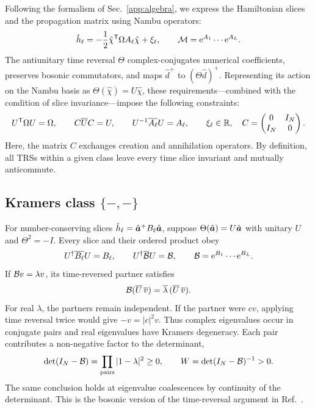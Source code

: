 Following the formalism of Sec.~\ref{app:algebra}, we express the Hamiltonian slices and the propagation matrix using Nambu operators:
\begin{equation}
    \hat h_\ell=-\frac12\hat\chi^{\mathsf{T}}\Omega A_\ell\hat\chi+\xi_\ell,
    \qquad \mathcal{M}=\mathrm{e}^{A_1}\cdots\mathrm{e}^{A_L}.
    \label{eq:trs_configuration_weight}
\end{equation}
The antiunitary time reversal $\Theta$ complex-conjugates numerical coefficients, preserves bosonic commutators, and maps $\hat d^+$ to $(\Theta\hat d)^+$. Representing its action on the Nambu basis as $\Theta(\hat\chi)=U\hat\chi$, these requirements—combined with the condition of slice invariance—impose the following constraints:
\begin{equation}
    U^{\mathsf{T}}\Omega U=\Omega,\qquad
    C\overline U C=U,\qquad
    U^{-1}\overline{A_\ell}U=A_\ell,\qquad \xi_\ell\in\mathbb R,
    \quad C=\begin{pmatrix}0&I_N\\I_N&0\end{pmatrix}.
    \label{eq:trs_physical_TR_conditions}
\end{equation}
Here, the matrix $C$ exchanges creation and annihilation operators. By definition, all TRSs within a given class leave every time slice invariant and mutually anticommute.

\subsection{Kramers class \texorpdfstring{\(\{-,-\}\)}{\{-,-\}}}
\label{app:trs_kramers}
\label{app:trs_number}

For number-conserving slices $\hat h_\ell=\hat{\bm{a}}^+B_\ell\hat{\bm{a}}$, suppose $\Theta(\hat{\bm{a}})=U\hat{\bm{a}}$ with unitary $U$ and $\Theta^2=-I$. Every slice and their ordered product obey
\begin{equation}
    U^\dagger\overline{B_\ell}U=B_\ell,\qquad
    U^\dagger\overline{\mathcal{B}}U=\mathcal{B},\qquad
    \mathcal{B}=\mathrm{e}^{B_1}\cdots\mathrm{e}^{B_L}.
    \label{eq:Bsym_prod}
\end{equation}
If $\mathcal{B}v=\lambda v$, its time-reversed partner satisfies
\begin{equation}
    \mathcal{B}(\overline U\,\overline v)=\overline\lambda\,(\overline U\,\overline v).
\end{equation}
For real $\lambda$, the partners remain independent. If the partner were $cv$, applying time reversal twice would give $-v=|c|^2v$. Thus complex eigenvalues occur in conjugate pairs and real eigenvalues have Kramers degeneracy. Each pair contributes a non-negative factor to the determinant,
\begin{equation}
    \det(I_N-\mathcal{B})=\prod_{\rm pairs}|1-\lambda|^2\ge0,
    \qquad W=\det(I_N-\mathcal{B})^{-1}>0.
    \label{eq:trs_det_positive_sm}
\end{equation}
The same conclusion holds at eigenvalue coalescences by continuity of the determinant. This is the bosonic version of the time-reversal argument in Ref.~\cite{wu2005prb}.

